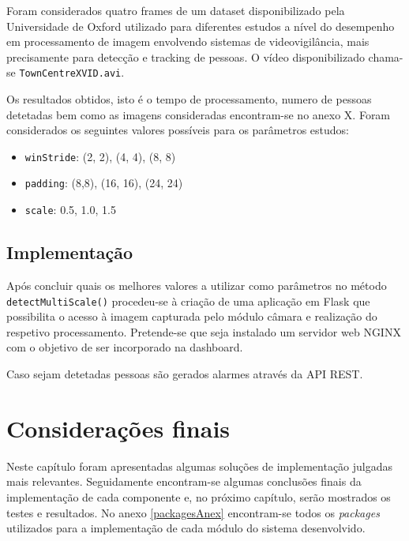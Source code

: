 Foram considerados quatro frames de um dataset disponibilizado pela Universidade de Oxford utilizado para diferentes estudos a nível do desempenho em processamento de imagem envolvendo sistemas de videovigilância, mais precisamente para detecção e tracking de pessoas\cite{imagProccdata}. O vídeo disponibilizado chama-se \texttt{TownCentreXVID.avi}. 

Os resultados obtidos, isto é o tempo de processamento, numero de pessoas detetadas bem como as imagens consideradas encontram-se no anexo X. Foram considerados os seguintes valores possíveis para os parâmetros estudos: 

\begin{itemize}
	\item \texttt{winStride}: (2, 2), (4, 4), (8, 8)
	
	\item \texttt{padding}: (8,8), (16, 16), (24, 24)
	
	\item \texttt{scale}: 0.5, 1.0, 1.5 
\end{itemize}


\subsection{Implementação}


Após concluir quais os melhores valores a utilizar como parâmetros no método \linebreak \texttt{detectMultiScale()}  procedeu-se à criação de uma aplicação em Flask que possibilita o acesso à imagem capturada pelo módulo câmara e realização do respetivo processamento. Pretende-se que seja instalado um servidor web NGINX com o objetivo de ser incorporado na dashboard. 


Caso sejam detetadas pessoas são gerados alarmes através da \ac{API} \ac{REST}. 
\fi







\section{Considerações finais}

Neste capítulo foram apresentadas algumas soluções de implementação julgadas mais relevantes. Seguidamente encontram-se algumas conclusões finais da implementação de cada componente e, no próximo capítulo, serão mostrados os testes e resultados. No anexo \ref{packagesAnex} encontram-se todos os \textit{packages} utilizados para a implementação de cada módulo do sistema desenvolvido. 



